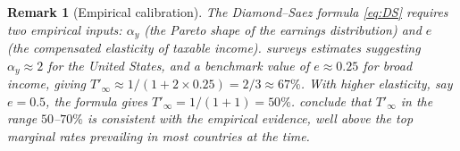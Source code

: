\documentclass[12pt]{article}
\newtheorem{remark}{Remark}
\begin{document}
\begin{remark}[Empirical calibration]
The Diamond--Saez formula \eqref{eq:DS} requires two empirical inputs:
$\alpha_y$ (the Pareto shape of the earnings distribution) and $e$ (the
compensated elasticity of taxable income).  \citet{saez2001using} surveys estimates
suggesting $\alpha_y \approx 2$ for the United States, and a benchmark value
of $e \approx 0.25$ for broad income, giving $T'_\infty \approx 1/(1+2\times
0.25) = 2/3 \approx 67\%$.  With higher elasticity, say $e = 0.5$, the
formula gives $T'_\infty = 1/(1+1) = 50\%$.  \citet{diamond2011case}
conclude that $T'_\infty$ in the range $50$--$70\%$ is consistent with the
empirical evidence, well above the top marginal rates prevailing in most
countries at the time.
\end{remark}




\end{document}
